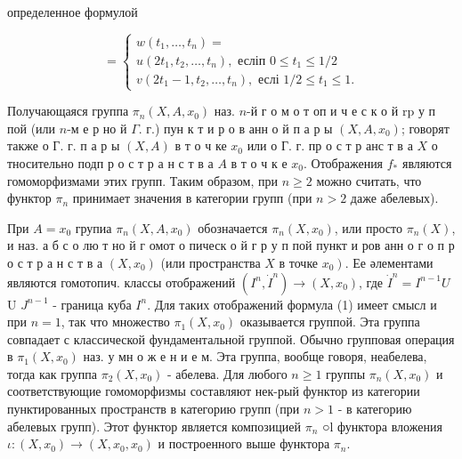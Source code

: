 \documentclass[10pt]{article}
\begin{document}
определенное формулой



\[

=\left\{\begin{array}{l}

w\left(t_{1}, \ldots, t_{n}\right)= \\

u\left(2 t_{1}, t_{2}, \ldots, t_{n}\right), \text { есліп } 0 \leqslant t_{1} \leqslant 1 / 2 \\

v\left(2 t_{1}-1, t_{2}, \ldots, t_{n}\right), \text { еслі } 1 / 2 \leqslant t_{1} \leqslant 1 .

\end{array}\right.

\]



Получающаяся группа $\pi_{n}\left(X, A, x_{0}\right)$ наз. $n$-й г о м о т оп и ч е с к о й $\mathrm{r} \mathrm{p}$ у п пой (или $n$-м е р но й $\Gamma$. г.) пун к т и р о в анн о й п а р ы $\left(X, A, x_{0}\right)$; говорят также о Г. г. п а р ы $(X, A)$ в т о ч ке $x_{0}$ или о Г. г. пр о с т р анс т в а $X$ о тносительно подп р о с т р а н с т в а $A$ в т о ч к е $x_{0}$. Отображения $f_{*}$ являются гомоморфизмами этих групп. Таким образом, при $n \geqslant 2$ можно считать, что функтор $\pi_{n}$ принимает значения в категории групп (при $n>2$ даже абелевых).



При $A=x_{0}$ групиа $\pi_{n}\left(X, A, x_{0}\right)$ обозначается $\pi_{n}\left(X, x_{0}\right)$, или просто $\pi_{n}(X)$, и наз. а б с о лю т но й г омот о пическ о й г р у п пой пункт и ров анн о г о п р о с т р а н с т в а $\left(X, x_{0}\right)$ (или пространства $X$ в точке $\left.x_{0}\right)$. Ее әлементами являются гомотопич. классы отображений $\left(I^{n}, \dot{I}^{n}\right) \rightarrow\left(X, x_{0}\right)$, где $\dot{I}^{n}=I^{n-1} U$ U $J^{n-1}$ - граница куба $I^{n}$. Для таких отображений формула (1) имеет смысл и при $n=1$, так что множество $\pi_{1}\left(X, x_{0}\right)$ оказывается группой. Эта группа совпадает с классической фундаментальной группой. Обычно групповая операция в $\pi_{1}\left(X, x_{0}\right)$ наз. у мн о ж е н и е м. Эта группа, вообще говоря, неабелева, тогда как группа $\pi_{2}\left(X, x_{0}\right)$ - абелева. Для любого $n \geqslant 1$ группы $\pi_{n}\left(X, x_{0}\right)$ и соответствующие гомоморфизмы составляют нек-рый функтор из категории пунктированных пространств в категорию групп (при $n>1$ - в категорию абелевых групп). Этот функтор является композицией $\pi_{n}$ ○l функтора вложения $\iota:\left(X, x_{0}\right) \rightarrow\left(X, x_{0}, x_{0}\right)$ и построенного выше функтора $\pi_{n}$.
\end{document}
